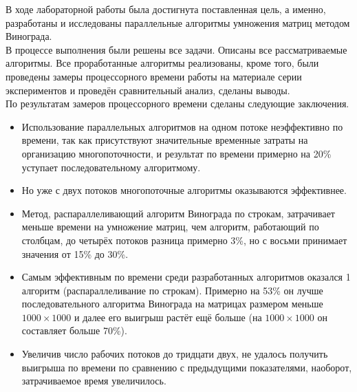 В ходе лабораторной работы была достигнута поставленная цель, а именно, разработаны и исследованы параллельные алгоритмы умножения матриц методом Винограда.\\

В процессе выполнения были решены все задачи. Описаны все рассматриваемые алгоритмы. Все проработанные алгоритмы реализованы, кроме того, были проведены замеры процессорного времени работы на материале серии экспериментов и проведён сравнительный анализ, сделаны выводы.\\

По результатам замеров процессорного времени сделаны следующие заключения.
\begin{itemize}
	\item Использование параллельных алгоритмов на одном потоке неэффективно по времени, так как присутствуют значительные временные затраты на организацию многопоточности, и результат по времени примерно на 20\% уступает последовательному алгоритмому. 
	\item Но уже с двух потоков многопоточные алгоритмы оказываются эффективнее.
	\item Метод, распараллеливающий алгоритм Винограда по строкам, затрачивает меньше времени на умножение матриц, чем алгоритм, работающий по столбцам, до четырёх потоков разница примерно 3\%, но с восьми принимает значения от 15\% до 30\%.
	\item Самым эффективным по времени среди разработанных алгоритмов оказался 1 алгоритм (распараллеливание по строкам). Примерно на 53\% он лучше последовательного алгоритма Винограда на матрицах размером меньше $1000 \times 1000$ и далее его выигрыш растёт ещё больше (на $1000 \times 1000$ он составляет больше 70\%).
	\item Увеличив число рабочих потоков до тридцати двух, не удалось получить выигрыша по времени по сравнению с предыдущими показателями, наоборот, затрачиваемое время увеличилось.
\end{itemize}